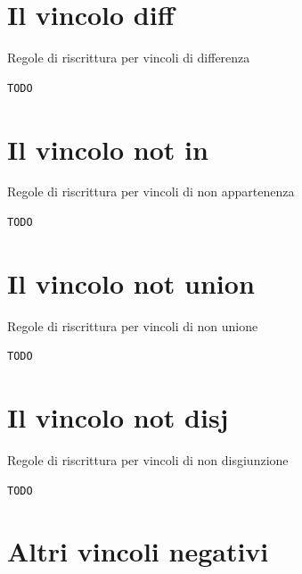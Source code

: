 \documentclass[12pt,a4paper,openright]{book}  %
\begin{document}
\section{Il vincolo diff}

\begin{algorithm}[H]
	\caption{Regole di riscrittura per vincoli di differenza}
	\label{alg:diff_constraints}
\end{algorithm}
\begin{verbatim}
TODO
\end{verbatim}

\section{Il vincolo not in}

\begin{algorithm}[H]
	\caption{Regole di riscrittura per vincoli di non appartenenza}
	\label{alg:notin_constraints}
\end{algorithm}
\begin{verbatim}
TODO
\end{verbatim}

\section{Il vincolo not union}

\begin{algorithm}[H]
	\caption{Regole di riscrittura per vincoli di non unione}
	\label{alg:notun_constraints}
\end{algorithm}
\begin{verbatim}
TODO
\end{verbatim}

\section{Il vincolo not disj}

\begin{algorithm}[H]
	\caption{Regole di riscrittura per vincoli di non disgiunzione}
	\label{alg:notdisj_constraints}
\end{algorithm}
\begin{verbatim}
TODO
\end{verbatim}

\section{Altri vincoli negativi}
\end{document}
